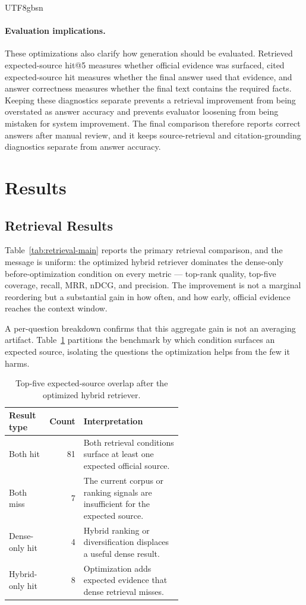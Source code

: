 \documentclass{article}
\begin{document}
\begin{CJK*}{UTF8}{gbsn}
\paragraph{Evaluation implications.}
These optimizations also clarify how generation should be evaluated. Retrieved expected-source hit@5 measures whether official evidence was surfaced, cited expected-source hit measures whether the final answer used that evidence, and answer correctness measures whether the final text contains the required facts. Keeping these diagnostics separate prevents a retrieval improvement from being overstated as answer accuracy and prevents evaluator loosening from being mistaken for system improvement. The final comparison therefore reports correct answers after manual review, and it keeps source-retrieval and citation-grounding diagnostics separate from answer accuracy.

\section{Results}

\subsection{Retrieval Results}

Table~\ref{tab:retrieval-main} reports the primary retrieval comparison, and the message is uniform: the optimized hybrid retriever dominates the dense-only before-optimization condition on every metric --- top-rank quality, top-five coverage, recall, MRR, nDCG, and precision. The improvement is not a marginal reordering but a substantial gain in how often, and how early, official evidence reaches the context window.

A per-question breakdown confirms that this aggregate gain is not an averaging artifact. Table~\ref{tab:failure-taxonomy} partitions the benchmark by which condition surfaces an expected source, isolating the questions the optimization helps from the few it harms.

\begin{table}[H]
\centering
\small
\caption{Top-five expected-source overlap after the optimized hybrid retriever.}
\label{tab:failure-taxonomy}
\begin{tabular}{lrp{0.58\linewidth}}
\toprule
Result type & Count & Interpretation \\
\midrule
Both hit & 81 & Both retrieval conditions surface at least one expected official source. \\
Both miss & 7 & The current corpus or ranking signals are insufficient for the expected source. \\
Dense-only hit & 4 & Hybrid ranking or diversification displaces a useful dense result. \\
Hybrid-only hit & 8 & Optimization adds expected evidence that dense retrieval misses. \\
\bottomrule
\end{tabular}
\end{table}


\end{CJK*}
\end{document}
